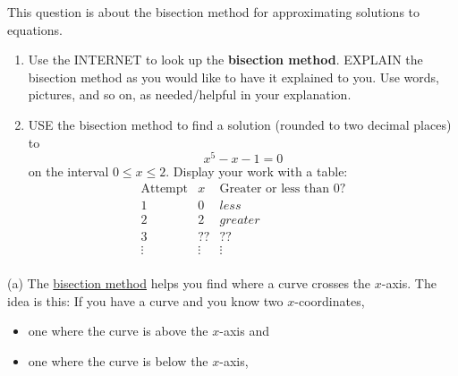 \documentclass{ximera}
\begin{document}
\begin{question} This question is about the bisection method for approximating solutions to equations.
  \begin{enumerate}
    \item Use the INTERNET to look up the \textbf{bisection
      method}. EXPLAIN the bisection method as you would like to have
      it explained to you.  Use words, pictures, and so on, as
      needed/helpful in your explanation.
  \item USE the bisection method to find a solution (rounded to two
    decimal places) to
  \[
  x^5-x-1=0
  \]
  on the interval $0\le x\le 2$. Display your work with a table:
  \[
  \begin{array}{|c|c|c|c|}\hline
    \text{Attempt} & x & \text{Greater or less than $0$?} \\ \hline\hline
    1 & 0 & less \\ \hline
    2 & 2 & greater  \\ \hline
    3 & ?? & ??  \\ \hline
    \vdots & \vdots & \vdots \\ 
  \end{array}
  \]
  \end{enumerate}
  \begin{freeResponse}
    (a) The \underline{bisection method} helps you find where a curve
    crosses the $x$-axis. The idea is this: If you have a curve and
    you know two $x$-coordinates,
    \begin{itemize}
      \item one where the curve is above the
        $x$-axis and
      \item one where the curve is below the $x$-axis,
    \end{itemize}
    \begin{center}
\end{center}
\end{freeResponse}
\end{question}
\end{document}
